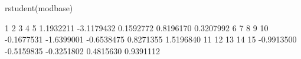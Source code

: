 \begin{Schunk}
\begin{Sinput}
 rstudent(modbase)
\end{Sinput}
\begin{Soutput}
         1          2          3          4          5 
 1.1932211 -3.1179432  0.1592772  0.8196170  0.3207992 
         6          7          8          9         10 
-0.1677531 -1.6399001 -0.6538475  0.8271355  1.5196840 
        11         12         13         14         15 
-0.9913500 -0.5159835 -0.3251802  0.4815630  0.9391112 
\end{Soutput}
\end{Schunk}

